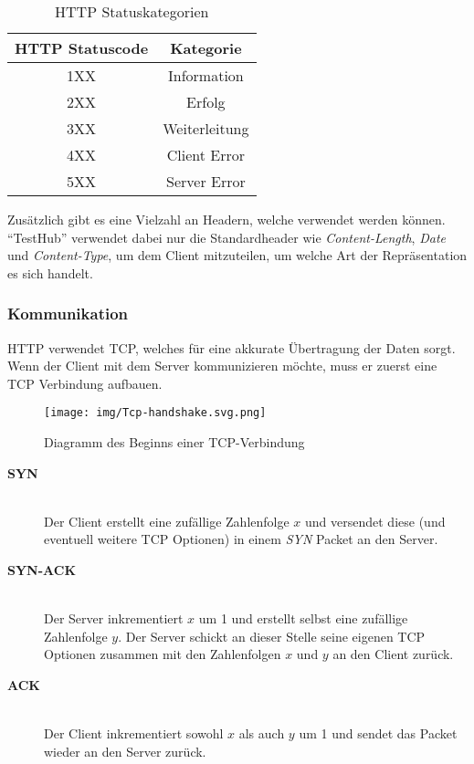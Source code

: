 \begin{table}[H]
    \centering
    \begin{tabular}{|c | c|} 
     \hline
     \textbf{HTTP Statuscode} & \textbf{Kategorie} \\ [1ex] 
     \hline
     1XX & Information \\ [1ex]
     \hline
     2XX & Erfolg \\ [1ex] 
     \hline
     3XX & Weiterleitung \\ [1ex] 
     \hline
     4XX & Client Error \\ [1ex] 
     \hline
     5XX & Server Error \\ [1ex] 
     \hline
    \end{tabular}
    \caption{HTTP Statuskategorien}
    \label{table:status}
\end{table}

Zusätzlich gibt es eine Vielzahl an Headern, welche verwendet werden können. 
``TestHub'' verwendet dabei nur die Standardheader wie \textit{Content-Length},
\textit{Date} und \textit{Content-Type}, um 
dem Client mitzuteilen, um welche Art der Repräsentation es sich handelt. 

\subsubsection{Kommunikation}
\gls{HTTP} verwendet \gls{TCP}, welches für eine akkurate Übertragung der Daten sorgt.
Wenn der Client mit dem Server kommunizieren möchte, muss er zuerst eine \gls{TCP}
Verbindung aufbauen. 

\begin{figure}[H]
    \texttt{[image: img/Tcp-handshake.svg.png]}
    \centering
    \caption{Diagramm des Beginns einer TCP-Verbindung~\cite{Wik10}}
\end{figure}

\makeatletter
\begin{description}
    
    \item[\textbf{SYN}]\hfill \\
    Der Client erstellt eine zufällige Zahlenfolge $x$ und versendet diese (und
    eventuell weitere TCP Optionen) in einem \textit{SYN} Packet an den Server.

    \item[\textbf{SYN-ACK}]\hfill \\
    Der Server inkrementiert $x$ um 1 und erstellt selbst eine zufällige 
    Zahlenfolge $y$. Der Server schickt an dieser Stelle seine eigenen TCP Optionen
    zusammen mit den Zahlenfolgen $x$ und $y$ an den Client zurück.

    \item[\textbf{ACK}\label{itm:ack}]\hfill \\
    Der Client inkrementiert sowohl $x$ als auch $y$ um 1 und sendet das Packet
    wieder an den Server zurück. 
\end{description}
\makeatother

